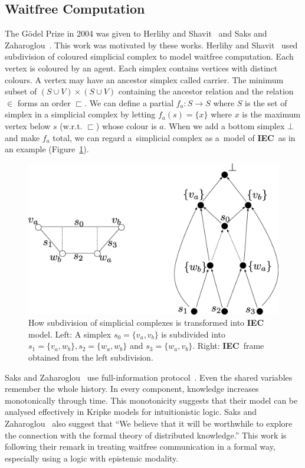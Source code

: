 \documentclass[doctor]{iscs-thesis}
\newcommand{\iec}{{\rm {\textbf{IEC}}}}
\begin{document}
\subsection{Waitfree Computation}
\label{Shavit}
The G\"{o}del Prize in 2004 was given to Herlihy and Shavit~\cite{herlihy1999topological}
and
Saks and Zaharoglou~\cite{saks2000wait}.
This work was motivated by these works.
Herlihy and Shavit~\cite{herlihy1999topological} used
 subdivision of coloured simplicial complex to model
waitfree computation. Each vertex is coloured by an agent. Each simplex contains vertices
with distinct colours. A vertex may have an ancestor simplex called carrier.
The minimum subset of $(S\cup V) \times (S\cup V)$
 containing the ancestor relation and the relation $\in$ forms an order $\sqsubset$.
We can define a partial
 $f_a: S\rightarrow S$ where $S$ is the set of simplex in
a simplicial complex by letting $f_a(s) = \{x\}$ where $x$ is the maximum vertex below $s$
(w.r.t. $\sqsubset$)
 whose colour is
$a$. When we add a bottom simplex $\bot$ and make $f_a$ total, we can regard
a~simplicial complex as a~model of \iec\, as in an example (Figure~\ref{subdivision}).
\begin{figure}
 \begin{center}
  \includegraphics[scale=0.3]{subdivision_original.eps}
 \end{center}
 \caption{How subdivision of simplicial complexes is transformed into \iec\, model.
Left: A simplex $s_0 = \{v_a, v_b\}$ is subdivided into $s_1 = \{v_a, w_b\}, s_2
 = \{w_a, w_b\}$ and $s_3 = \{w_a, v_b\}$. Right: \iec\, frame obtained from the left
 subdivision.}
\label{subdivision}
\end{figure}

Saks and Zaharoglou~\cite{saks2000wait} use full-information protocol~\cite{182113}.
Even the shared variables remember the whole history.
In every component, knowledge increases monotonically through time.
This monotonicity suggests that their model can be analysed effectively in Kripke models
for intuitionistic logic.
Saks and Zaharoglou~\cite{saks2000wait} also suggest that 
``We believe that it will be worthwhile to explore the
connection with the formal theory of distributed
knowledge.'' This work is following their remark in treating waitfree communication in a
formal way, especially using a logic with epistemic modality.
\end{document}

